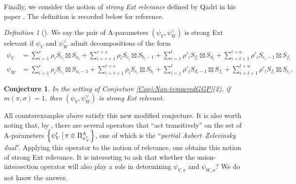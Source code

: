\documentclass[11pt,letterpaper]{amsart}
\theoremstyle{plain}
\newcounter{theorem}[section]
\numberwithin{theorem}{section}
\numberwithin{equation}{subsection}
\newtheorem{Conj}[theorem]{Conjecture}
\theoremstyle{remark}
\newtheorem{Def}[theorem]{Definition}
\def\AP{\Pi^{\rm A}} %
\begin{document}
\vskip 5pt

Finally, we consider the notion of \emph{strong Ext relevance} defined by Qadri in his paper \cite[Def. 1.1]{MR4846726}. The definition is recorded below for reference.
\begin{Def}[{\cite[Def. 1.1]{MR4846726}}]
We say the pair of A-parameters \(\left(\psi_V,\psi_W^\vee\right)\) is strong Ext relevant if $\psi_V$ and $\psi_W^\vee$ admit decompositions of the form
    \begin{align*}
        \psi_V&=\sum^r_{i=1}\rho_i S_{c_i}\boxtimes S_{a_i}+ \sum^{r+s}_{i=r+1}\rho_i S_{c_i}\boxtimes S_{b_i-1}+\sum^t_{i=1}\rho'_i S_{f_i}\boxtimes S_{d_i}+ \sum^{t+u}_{i=t+1}\rho'_i S_{e_i-1}\boxtimes S_{f_i}\\
        \psi_W&=\sum^r_{i=1}\rho_i S_{c_i}\boxtimes S_{a_i-1}+ \sum^{r+s}_{i=r+1}\rho_i S_{c_i}\boxtimes S_{b_i}+\sum^t_{i=1}\rho'_i S_{d_i-1}\boxtimes S_{f_i}+ \sum^{t+u}_{i=t+1}\rho'_i S_{f_i}\boxtimes S_{e_i}.
    \end{align*}
\end{Def}

\vskip 5pt

\begin{Conj}
In the setting of Conjecture \ref{Conj:Non-temperedGGP}(2), if \(m\left(\pi,\sigma\right)=1\), then \(\left(\psi_V,\psi^{\vee}_W\right)\) is strong Ext relevant.
\end{Conj}

\vskip 5pt

All counterexamples above satisfy this new modified conjecture. It is also worth noting that, by \cite{MR4661536, MR4912257}, there are several operators that ``act transitively'' on the set of A-parameters $\left\{\psi'_V\,\big|\,\pi\in\AP_{\psi'_V}\right\}$, one of which is the ``\emph{partial Aubert--Zelevinsky dual}''. Applying this operator to the notion of relevance, one obtains this notion of strong Ext relevance. It is interesting to ask that whether the union-intersection operator will also play a role in determining $\psi_{V,\pi}$ and $\psi_{W,\sigma}$? We do not know the answer. %
\end{document}
